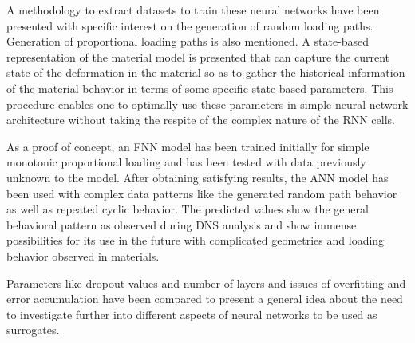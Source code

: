 A methodology to extract datasets to train these neural networks have been presented with specific interest on the generation of random loading paths. Generation of proportional loading paths is also mentioned. A state-based representation of the material model is presented that can capture the current state of the deformation in the material so as to gather the historical information of the material behavior in terms of some specific state based parameters. This procedure enables one to optimally use these parameters in simple neural network architecture without taking the respite of the complex nature of the RNN cells. 

As a proof of concept, an FNN model has been trained initially for simple monotonic proportional loading and has been tested with data previously unknown to the model. After obtaining satisfying results, the ANN model has been used with complex data patterns like the generated random path behavior as well as repeated cyclic behavior.  The predicted values show the general behavioral pattern as observed during DNS analysis and show immense possibilities for its use in the future with complicated geometries and loading behavior observed in materials.

Parameters like dropout values and number of layers and issues of overfitting and error accumulation have been compared to present a general idea about the need to investigate further into different aspects of neural networks to be used as surrogates.

